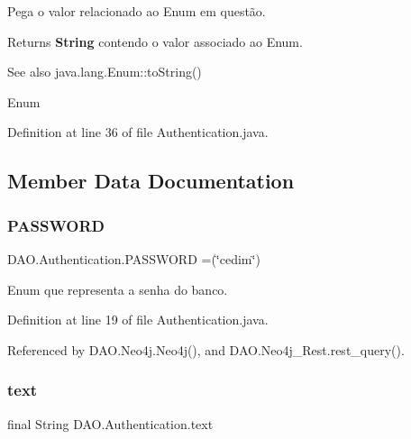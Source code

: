 Pega o valor relacionado ao Enum em questão.

\begin{DoxyReturn}{Returns}
{\bfseries String} contendo o valor associado ao Enum.
\end{DoxyReturn}
\begin{DoxySeeAlso}{See also}
java.\+lang.\+Enum\+::to\+String() 

Enum 
\end{DoxySeeAlso}


Definition at line 36 of file Authentication.\+java.



\subsection{Member Data Documentation}
\hypertarget{enumDAO_1_1Authentication_acd4baefc303c56d134d8ee3b8cec2b7a}{}\label{enumDAO_1_1Authentication_acd4baefc303c56d134d8ee3b8cec2b7a} 
\subsubsection{\texorpdfstring{P\+A\+S\+S\+W\+O\+RD}{PASSWORD}}
{\footnotesize\ttfamily D\+A\+O.\+Authentication.\+P\+A\+S\+S\+W\+O\+RD =(\char`\"{}cedim\char`\"{})}

Enum que representa a senha do banco. 

Definition at line 19 of file Authentication.\+java.



Referenced by D\+A\+O.\+Neo4j.\+Neo4j(), and D\+A\+O.\+Neo4j\+\_\+\+Rest.\+rest\+\_\+query().

\hypertarget{enumDAO_1_1Authentication_ad4204da02a05a24b88a131a38ab8af2a}{}\label{enumDAO_1_1Authentication_ad4204da02a05a24b88a131a38ab8af2a} 
\subsubsection{\texorpdfstring{text}{text}}
{\footnotesize\ttfamily final String D\+A\+O.\+Authentication.\+text\hspace{0.3cm}{\ttfamily [private]}}



